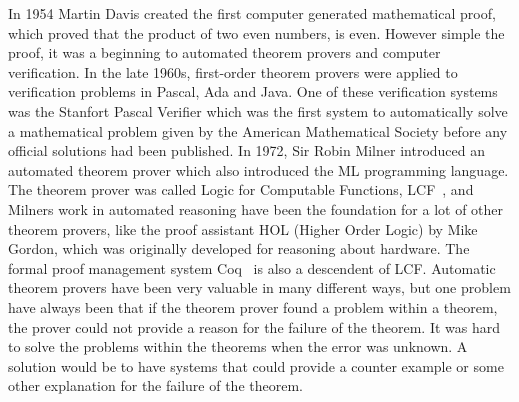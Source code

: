 In 1954 Martin Davis created the first computer generated mathematical proof, which proved that the product of two even numbers, is even. However simple the proof, it was a beginning to automated theorem provers and computer verification.
In the late 1960s, first-order theorem provers were applied to verification problems in Pascal, Ada and Java. One of these verification systems was the Stanfort Pascal Verifier\cite{Verifier1979} which was the first system to automatically solve a mathematical problem given by the American Mathematical Society before any official solutions had been published.
In 1972, Sir Robin Milner introduced an automated theorem prover which also introduced the ML programming language. The theorem prover was called Logic for Computable Functions, LCF~\cite{Milner1972}, and Milners work in automated reasoning have been the foundation for a lot of other theorem provers, like the proof assistant HOL (Higher Order Logic) by Mike Gordon, which was originally developed for reasoning about hardware. The formal proof management system Coq~\cite{coq} is also a descendent of LCF.
Automatic theorem provers have been very valuable in many different ways, but one problem have always been that if the theorem prover found a problem within a theorem, the prover could not provide a reason for the failure of the theorem. It was hard to solve the problems within the theorems when the error was unknown. A solution would be to have systems that could provide a counter example or some other explanation for the failure of the theorem. \\


